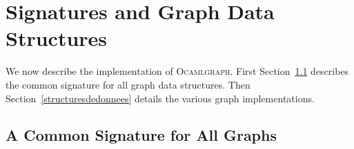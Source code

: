 \documentclass[tfpsymp]{tfp05symp}
\newcommand{\ocamlgraph}{\textsc{Ocamlgraph}\xspace}
\begin{document}

\section{Signatures and Graph Data Structures}\label{implementation}

We now describe the implementation of
\ocamlgraph. First Section~\ref{interface} describes the common
signature for all graph data structures.
Then Section~\ref{structuresdedonnees} details the various graph
implementations.

\subsection{A Common Signature for All Graphs}\label{interface}
\end{document}
